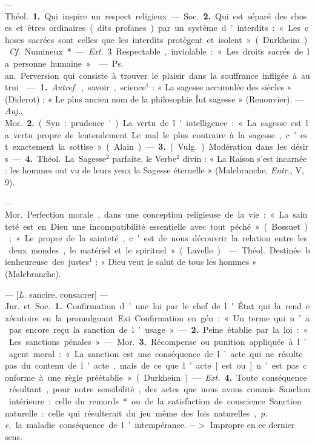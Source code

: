 
	\begin{itemize}[leftmargin=1cm, label=, itemsep=1pt]

 — \si{Théol.} {\bf 1.} Qui inspire un
respect religieux. — \si{Soc.} {\bf 2.} Qui est
séparé des choses et êtres ordinaires
(dits profanes) par un système d’interdits : « Les choses sacrées sont
celles que les interdits protègent et
isolent » (Durkheim). {\it Cf.} Numineux*.
— {\it Ext.} 3 Respectable, inviolable :
« Les droits sacrés de la personne
humaine. »

 — \si{Ps. an.} Perversion qui
consiste à trouver le plaisir dans la
souffrance infligée à autrui.

 — {\bf 1.} {\it Autref.}, savoir, science$^1$ :
« La sagesse accumulée des siècles »
(Diderot) ; « Le plus ancien nom de
la philosophie Îut sagesse » (Renouvier). — {\it Auj.}, \si{Mor.} {\bf 2.} (Syn. : prudence') La vertu de l'intelligence :
« La sagesse est la vertu propre de
lentendement... Le mal le plus contraire à la sagesse, c’est exactement
la sottise » (Alain). — {\bf 3.} (\si{Vulg.}).
Modération dans les désirs.

— {\bf 4.} \si{Théol.} La Sagesse$^2$ parfaite,
le Verbe$^2$ divin : « La Raison s'est
incarnée : les hommes ont vu de
leurs yeux la Sagesse éternelle »
(Malebranche, {\it Entr.}, V, 9).

 — \si{Mor.} Perfection morale,
dans une conception religieuse de la
vie : « La sainteté est en Dieu une
incompatibilité essentielle avec tout
péché » (Bossuet) ; « Le propre de la
sainteté, c’est de nous découvrir la
relation entre les deux mondes, le
matériel et le spirituel » (Lavelle).

 — \si{Théol.} Destinée bienheureuse des justes$^1$ : « Dieu veut le
salut de tous les hommes » (Malebranche).

 — [{\it L.} sancire, consacrer] —
\si{Jur.} et \si{Soc.} {\bf 1.} Confirmation d’une
loi par le chef de l'État qui la rend
exécutoire en la promulguant. Exi.
Confirmation en gén. : « Un terme
qui n’a pas encore reçu la sanction
de l'usage. » — {\bf 2.} Peine établie par
la loi : « Les sanctions pénales. »

— \si{Mor.} {\bf 3.} Récompense ou punition appliquée à l’agent moral : « La
sanction est une conséquence de
l’acte qui ne résulte pas du contenu
de l'acte, mais de ce que l’acte [est
ou] n’est pas conforme à une règle
préétablie » (Durkheim). — {\it Ext.} {\bf 4.}
Toute conséquence résultant, pour
notre sensibilité, des actes que nous
avons commis. Sanclion intérieure :
celle du remords* ou de la satisfaction de conscience. Sanction naturelle : celle qui résulterait du jeu
même des lois naturelles, {\it p. e.} la
maladie conséquence de l’intempérance. $->$ Impropre en ce dernier
sens.


\end{itemize}
